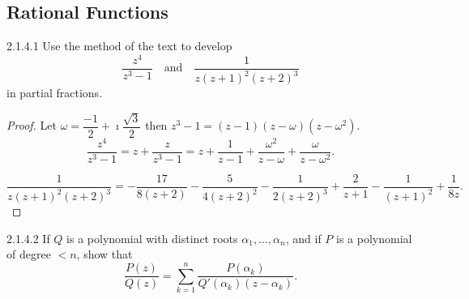 \subsection{Rational Functions}

\begin{problem}{2.1.4.1}
Use the method of the text to develop
\[
	\frac{z^{4}}{z^{3} - 1} \quad \text{and} \quad \frac{1}{z{(z+1)}^{2}{(z+2)}^{3}}
\]
in partial fractions.
\end{problem}

\begin{proof}
	Let \( \omega = \dfrac{-1}{2} + \imath\dfrac{\sqrt{3}}{2} \) then \( z^{3} - 1 = (z - 1)(z - \omega)(z - \omega^{2}) \).
	\[
		\frac{z^{4}}{z^{3} - 1} = z + \dfrac{z}{z^{3} - 1} = z + \dfrac{1}{z - 1} + \dfrac{\omega^{2}}{z - \omega} + \dfrac{\omega}{z - \omega^{2}}.
	\]

	\[
		\dfrac{1}{z{(z + 1)}^{2}{(z + 2)}^{3}} = - \frac{17}{8 (z + 2)} - \frac{5}{4 {\left(z + 2\right)}^{2}} - \frac{1}{2 {\left(z + 2\right)}^{3}} + \frac{2}{z + 1} - \frac{1}{{\left(z + 1\right)}^{2}} + \frac{1}{8 z}.
	\]
\end{proof}

\begin{problem}{2.1.4.2}
If \( Q \) is a polynomial with distinct roots \( \alpha_{1}, \ldots, \alpha_{n} \), and if \( P \) is a polynomial of degree \( < n \), show that
\[
	\frac{P(z)}{Q(z)} = \sum_{k=1}^{n} \frac{P(\alpha_{k})}{Q'(\alpha_{k})(z - \alpha_{k})}.
\]
\end{problem}

